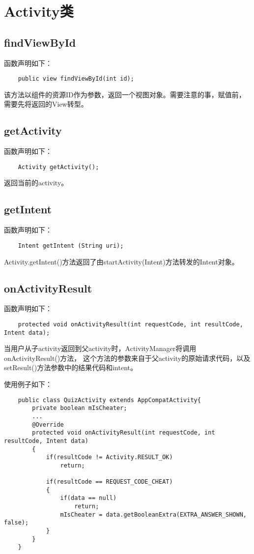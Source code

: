 \documentclass[a4paper,left=2.5cm,right=2.5cm,11pt]{article}
\begin{document}


\section{Activity类}
\subsection{findViewById}
	函数声明如下：
	\begin{lstlisting}
	public view findViewById(int id);
	\end{lstlisting}

	该方法以组件的资源ID作为参数，返回一个视图对象。需要注意的事，赋值前，需要先将返回的View转型。

\subsection{getActivity}
	函数声明如下：
	\begin{lstlisting}
	Activity getActivity();
	\end{lstlisting}

	返回当前的activity。

\subsection{getIntent}
	函数声明如下：
	\begin{lstlisting}
	Intent getIntent (String uri);
	\end{lstlisting}

	Activity.getIntent()方法返回了由startActivity(Intent)方法转发的Intent对象。

\subsection{onActivityResult}
	函数声明如下：
	\begin{lstlisting}
	protected void onActivityResult(int requestCode, int resultCode, Intent data);
	\end{lstlisting}

	当用户从子activity返回到父activity时，ActivityManager将调用onActivityResult()方法，
	这个方法的参数来自于父activity的原始请求代码，以及setResult()方法参数中的结果代码和intent。\par

	使用例子如下：
	\begin{lstlisting}
	public class QuizActivity extends AppCompatActivity{
		private boolean mIsCheater;
		...
		@Override
		protected void onActivityResult(int requestCode, int resultCode, Intent data)
		{
			if(resultCode != Activity.RESULT_OK)
				return;
			
			if(resultCode == REQUEST_CODE_CHEAT)
			{
				if(data == null)
					return;
				mIsCheater = data.getBooleanExtra(EXTRA_ANSWER_SHOWN, false);
			}
		}
	}
	\end{lstlisting}
\end{document}
